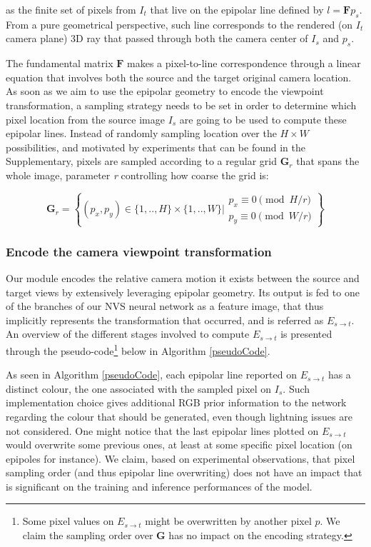 as the finite set of pixels from $I_{t}$ that live on the epipolar line defined by $l=\mathbf{F}p_{s}$. From a pure geometrical perspective, such line corresponds to the rendered (on $I_{t}$ camera plane) 3D ray that passed through both the camera center of $I_{s}$ and $p_{s}$. 

The fundamental matrix $\mathbf{F}$ makes a pixel-to-line correspondence through a linear equation that involves both the source and the target original camera location. As soon as we aim to use the epipolar geometry to encode the viewpoint transformation, a sampling strategy needs to be set in order to determine which pixel location from the source image $I_{s}$ are going to be used to compute these epipolar lines. Instead of randomly sampling location over the $H\times W$ possibilities, and motivated by experiments that can be found in the Supplementary, pixels are sampled according to a regular grid $\textbf{G}_{r}$ that spans the whole image, parameter \textit{r} controlling how coarse the grid is: 

\begin{equation}
    \mathbf{G}_{r} = \left\{(p_{x},p_{y}) \in \{1,..,H\}\times \{1,..,W\} \Big\rvert \begin{array}{l}
                    p_x \equiv 0 \pmod{H/r}\\
             p_y \equiv 0 \pmod{W/r}
              \end{array}\right\}
\end{equation}


\subsubsection{Encode the camera viewpoint transformation}

Our module encodes the relative camera motion it exists between the source and target views by extensively leveraging epipolar geometry. Its output is fed to one of the branches of our NVS neural network as a feature image, that thus implicitly represents the transformation that occurred, and is referred as $E_{s\xrightarrow{}t}$.
An overview of the different stages involved to compute $E_{s\xrightarrow{}t}$ is presented through the pseudo-code\footnote{Some pixel values on $E_{s\xrightarrow{}t}$ might be overwritten by another pixel $p$. We claim the sampling order over \textbf{G} has no impact on the encoding strategy.} below in Algorithm \ref{pseudoCode}. \newline

As seen in Algorithm \ref{pseudoCode}, each epipolar line reported on $E_{s\xrightarrow{}t}$ has a distinct colour, the one associated with the sampled pixel on $I_s$. Such implementation choice gives additional RGB prior information to the network regarding the colour that should be generated, even though lightning issues are not considered. One might notice that the last epipolar lines plotted on $E_{s\xrightarrow{}t}$ would overwrite some previous ones, at least at some specific pixel location (on epipoles for instance). We claim, based on experimental observations, that pixel sampling order (and thus epipolar line overwriting) does not have an impact that is significant on the training and inference performances of the model. 

